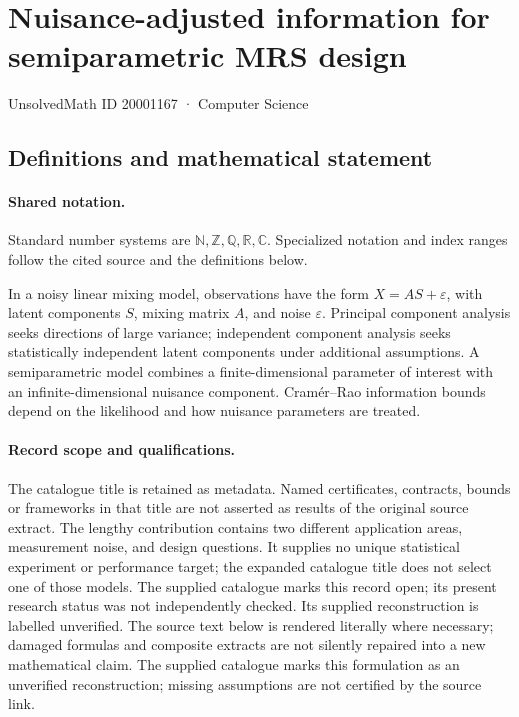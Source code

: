 \documentclass[11pt]{article}
\begin{document}
\setcounter{section}{20001166}
\section{Nuisance-adjusted information for semiparametric MRS design}\label{20001167}
{\small\sffamily UnsolvedMath ID 20001167 · Computer Science}
\subsection{Definitions and mathematical statement}

\paragraph{Shared notation.}Standard number systems are $\mathbb N,\mathbb Z,\mathbb Q,\mathbb R,\mathbb C$. Specialized notation and index ranges follow the cited source and the definitions below.


In a noisy linear mixing model, observations have the form $X=AS+\varepsilon$, with latent components $S$, mixing matrix $A$, and noise $\varepsilon$. Principal component analysis seeks directions of large variance; independent component analysis seeks statistically independent latent components under additional assumptions. A semiparametric model combines a finite-dimensional parameter of interest with an infinite-dimensional nuisance component. Cramér--Rao information bounds depend on the likelihood and how nuisance parameters are treated.
\paragraph{Record scope and qualifications.}
The catalogue title is retained as metadata. Named certificates, contracts, bounds or frameworks in that title are not asserted as results of the original source extract.
The lengthy contribution contains two different application areas, measurement noise, and design questions. It supplies no unique statistical experiment or performance target; the expanded catalogue title does not select one of those models. The supplied catalogue marks this record open; its present research status was not independently checked. Its supplied reconstruction is labelled unverified.
The source text below is rendered literally where necessary; damaged formulas and composite extracts are not silently repaired into a new mathematical claim.
The supplied catalogue marks this formulation as an unverified reconstruction; missing assumptions are not certified by the source link.
\end{document}
